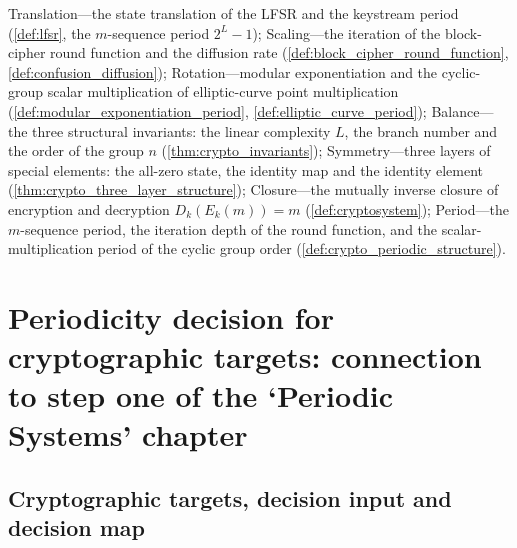 \begin{remark}\label{rem:crypto_seven_themes}
Translation---the state translation of the LFSR and the keystream period (\cref{def:lfsr}, the \(m\)-sequence period \(2^L-1\));
Scaling---the iteration of the block-cipher round function and the diffusion rate (\cref{def:block_cipher_round_function}, \cref{def:confusion_diffusion});
Rotation---modular exponentiation and the cyclic-group scalar multiplication of elliptic-curve point multiplication (\cref{def:modular_exponentiation_period}, \cref{def:elliptic_curve_period});
Balance---the three structural invariants: the linear complexity \(L\), the branch number and the order of the group \(n\) (\cref{thm:crypto_invariants});
Symmetry---three layers of special elements: the all-zero state, the identity map and the identity element (\cref{thm:crypto_three_layer_structure});
Closure---the mutually inverse closure of encryption and decryption \(D_k(E_k(m))=m\) (\cref{def:cryptosystem});
Period---the \(m\)-sequence period, the iteration depth of the round function, and the scalar-multiplication period of the cyclic group order (\cref{def:crypto_periodic_structure}).
\end{remark}

\section{Periodicity decision for cryptographic targets: connection to step one of the `Periodic Systems' chapter}
\label{sec:crypto_periodicity_decision}

\subsection{Cryptographic targets, decision input and decision map}

